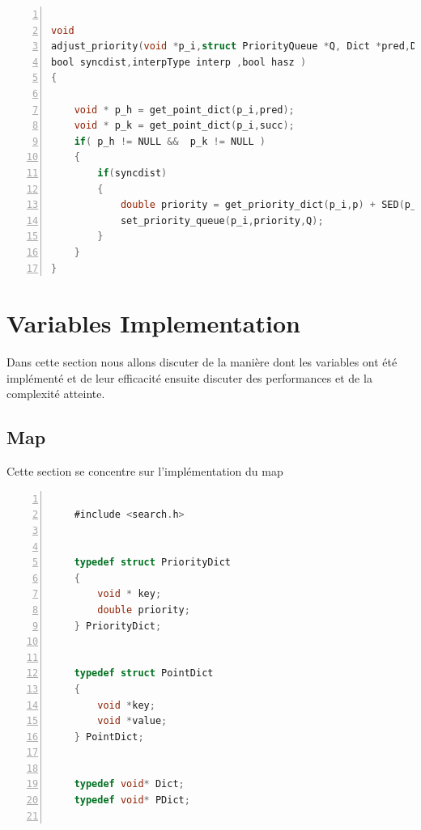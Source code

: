 \documentclass[twoside,12pt, a4paper]{report}
\begin{document}
\begin{lstlisting}[language=C, % Spécifie le langage du code
	caption={adjust\_priority}, % Légende du listing
	label=lst:adjust_c, % Étiquette pour référencer le listing
	numbers=left, 
	numberstyle=\tiny\color{gray}, 
	stepnumber=1, 
	frame=single,
	breaklines=true, 
	postbreak=\mbox{\textcolor{red}{$\hookrightarrow$}\space},
	showstringspaces=false 
	]
	
void
adjust_priority(void *p_i,struct PriorityQueue *Q, Dict *pred,Dict *succ,PDict  *p,
bool syncdist,interpType interp ,bool hasz )
{
	
	void * p_h = get_point_dict(p_i,pred);
	void * p_k = get_point_dict(p_i,succ);
	if( p_h != NULL &&  p_k != NULL )
	{
		if(syncdist)
		{
			double priority = get_priority_dict(p_i,p) + SED(p_h,p_i,p_k, interp , hasz );
			set_priority_queue(p_i,priority,Q);
		}
	}
}	

\end{lstlisting}

\section{Variables Implementation}
Dans cette section nous allons discuter de la manière dont les variables ont été implémenté et de leur efficacité ensuite discuter des performances et de la complexité atteinte. 

\subsection{Map}
Cette section se concentre sur l'implémentation du map

\begin{lstlisting}[language=C, % Spécifie le langage du code
	caption={Map C implementation}, % Légende du listing
	label=lst:map_c, % Étiquette pour référencer le listing
	numbers=left, 
	numberstyle=\tiny\color{gray}, 
	stepnumber=1, 
	frame=single,
	breaklines=true, 
	postbreak=\mbox{\textcolor{red}{$\hookrightarrow$}\space},
	showstringspaces=false 
	]
	
	#include <search.h>
	
	
	typedef struct PriorityDict
	{
		void * key;
		double priority;
	} PriorityDict;
	
	
	typedef struct PointDict
	{
		void *key;
		void *value;
	} PointDict;
	
	
	typedef void* Dict;
	typedef void* PDict;
	
\end{lstlisting}
\end{document}
